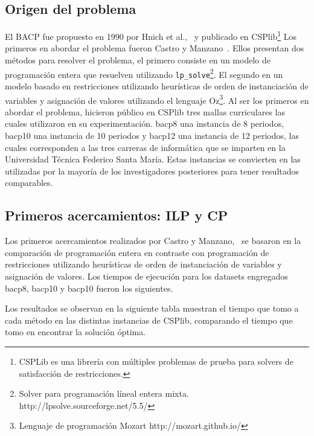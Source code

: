 \documentclass[letterpaper,10pt]{article}
\begin{document}
\subsection{Origen del problema}

El BACP fue propuesto en 1990 por Hnich et al.,~\cite{csplibprob030} y publicado en CSPlib\footnote{CSPLib es una librería con múltiples problemas de prueba para solvers de satisfacción de restricciones.}
Los primeros en abordar el problema fueron Castro y Manzano~\cite{DBLP:journals/corr/cs-PL-0110007}. Ellos presentan dos métodos para resolver el problema, el primero consiste en un modelo de programación entera que resuelven utilizando \verb+lp_solve+\footnote{Solver para programación líneal entera mixta. http://lpsolve.sourceforge.net/5.5/}. El segundo en un modelo basado en restricciones utilizando heurísticas de orden de instanciación de variables y asignación de valores utilizando el lenguaje Oz\footnote{Lenguaje de programación Mozart http://mozart.github.io/}. Al ser los primeros en abordar el problema, hicieron público en CSPlib tres mallas curriculares las cuales utilizaron en su experimentación. bacp8 una instancia de 8 periodos, bacp10 una instancia de 10 periodos y bacp12 una instancia de 12 periodos, las cuales corresponden a las tres carreras de informática que se imparten en la Universidad Técnica Federico Santa María. Estas instancias se convierten en las utilizadas por la mayoría de los investigadores posteriores para tener resultados comparables.

\subsection{Primeros acercamientos: ILP y CP}

Los primeros acercamientos realizados por Castro y Manzano,~\cite{DBLP:journals/corr/cs-PL-0110007} se basaron en la comparación de programación entera en contraste con programación de restricciones utilizando heurísticas de orden de instanciación de variables y asignación de valores. Los tiempos de ejecución para los datasets engregados bacp8, bacp10 y bacp10 fueron los siguientes.

Los resultados se observan en la siguiente tabla muestran el tiempo que tomo a cada método en las distintas instancias de CSPlib, comparando el tiempo que tomo en encontrar la solución óptima.
\end{document}

